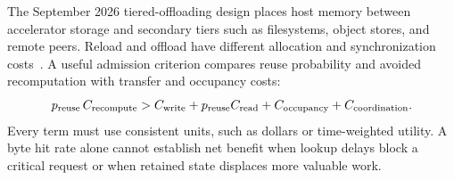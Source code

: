 The September 2026 tiered-offloading design places host memory between accelerator storage and secondary tiers such as filesystems, object stores, and remote peers. Reload and offload have different allocation and synchronization costs~\cite{root_vllm2026tiers}. A useful admission criterion compares reuse probability and avoided recomputation with transfer and occupancy costs:
\begin{equation}
 p_{\rm reuse}\,C_{\rm recompute}
 > C_{\rm write}+p_{\rm reuse}C_{\rm read}
 +C_{\rm occupancy}+C_{\rm coordination}.
\end{equation}
Every term must use consistent units, such as dollars or time-weighted utility. A byte hit rate alone cannot establish net benefit when lookup delays block a critical request or when retained state displaces more valuable work.

